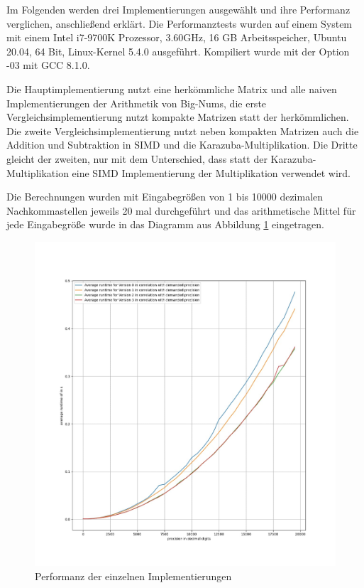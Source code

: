 \documentclass[course=erap]{aspdoc}
\begin{document}
Im Folgenden werden drei Implementierungen ausgewählt und ihre Performanz verglichen, anschließend erklärt. Die Performanztests wurden auf einem System mit einem Intel i7-9700K Prozessor, 3.60GHz, 16 GB Arbeitsspeicher,
Ubuntu 20.04, 64 Bit, Linux-Kernel 5.4.0 ausgeführt. Kompiliert wurde mit der Option -03 mit GCC 8.1.0. \par
Die Hauptimplementierung nutzt eine herkömmliche Matrix und alle naiven Implementierungen der Arithmetik von Big-Nums, die erste Vergleichsimplementierung nutzt kompakte Matrizen statt der herkömmlichen. 
Die zweite Vergleichsimplementierung nutzt neben kompakten Matrizen auch die Addition und Subtraktion in SIMD und die Karazuba-Multiplikation. Die Dritte gleicht der zweiten, nur mit dem Unterschied, dass statt der 
Karazuba-Multiplikation eine SIMD Implementierung der Multiplikation verwendet wird. \par

Die Berechnungen wurden mit Eingabegrößen von 1 bis 10000 dezimalen Nachkommastellen jeweils 20 mal durchgeführt und das arithmetische Mittel für jede Eingabegröße wurde in das Diagramm aus Abbildung \ref{img:performanz-diagramm} 
eingetragen.
\begin{figure}[h] \centering
  \includegraphics[scale=0.25]{graphiken/performanz-diagramm.jpg}
  \caption{Performanz der einzelnen Implementierungen} \label{img:performanz-diagramm}
\end{figure} 
\end{document}
